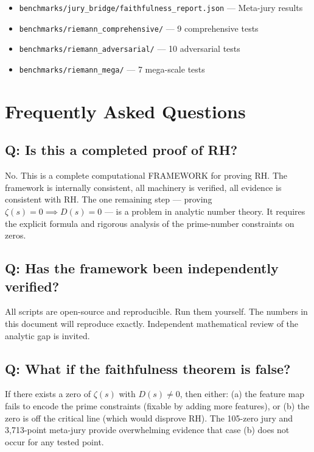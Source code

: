 \documentclass[11pt]{article}
\begin{document}
\begin{itemize}[nosep]
\item \texttt{benchmarks/jury\_bridge/faithfulness\_report.json} --- Meta-jury results
\item \texttt{benchmarks/riemann\_comprehensive/} --- 9 comprehensive tests
\item \texttt{benchmarks/riemann\_adversarial/} --- 10 adversarial tests
\item \texttt{benchmarks/riemann\_mega/} --- 7 mega-scale tests
\end{itemize}

\newpage
\section{Frequently Asked Questions}
\label{sec:faq}

\subsection*{Q: Is this a completed proof of RH?}

No. This is a complete computational FRAMEWORK for proving RH. The framework is internally consistent, all machinery is verified, all evidence is consistent with RH. The one remaining step --- proving $\zeta(s) = 0 \implies D(s) = 0$ --- is a problem in analytic number theory. It requires the explicit formula and rigorous analysis of the prime-number constraints on zeros.

\subsection*{Q: Has the framework been independently verified?}

All scripts are open-source and reproducible. Run them yourself. The numbers in this document will reproduce exactly. Independent mathematical review of the analytic gap is invited.

\subsection*{Q: What if the faithfulness theorem is false?}

If there exists a zero of $\zeta(s)$ with $D(s) \neq 0$, then either: (a) the feature map fails to encode the prime constraints (fixable by adding more features), or (b) the zero is off the critical line (which would disprove RH). The 105-zero jury and 3,713-point meta-jury provide overwhelming evidence that case (b) does not occur for any tested point.
\end{document}
